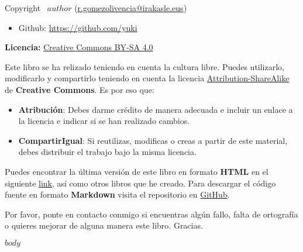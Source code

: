 \documentclass[11pt,titlepage,twoside,openany]{book}
\makeatletter
\renewcommand\tableofcontents{
  \begingroup
    \hypersetup{hidelinks} %
    \pagestyle{toc}
    \setcounter{tocdepth}{2}    %
    \setcounter{secnumdepth}{4} %
    \setlength{\parskip}{0em}
    \@starttoc{toc}
    \setlength{\parskip}{1.2em}
  \endgroup
  \thispagestyle{toc} %
  \clearpage
}
\newenvironment{custombox}[4]{
  \begin{tcolorbox}[
      colframe=#1, colbacktitle=#1,
      colupper=#1, colback=#2,
      enhanced, sidebyside, segmentation hidden,
      lefthand width=1.2cm,
      title=\textbf{#3},]
    \centering
    \color{#1}
    \fontsize{30pt}{-10pt}#4
    \tcblower
    \color{#1}
}{
  \end{tcolorbox}
}
\newenvironment{infobox}{
  \begin{custombox}{cyan!60!black}{cyan!5!white}{Información}{\faInfoCircle}
}{
  \end{custombox}
}
\makeatother
\begin{document}
\restoregeometry
\clearpage %

\thispagestyle{empty}

\null
\vfill
\begin{flushleft}
    

    Copyright \textcopyright \ $author$ \hspace{1pt} (\href{mailto:r.gomezolivencia@irakasle.eus}{r.gomezolivencia@irakasle.eus})
    \begin{itemize}
        \item Github: \href{https://github.com/yuki}{https://github.com/yuki}
    \end{itemize}


    \vspace{5mm}
    \textbf{Licencia: } \href{https://creativecommons.org/licenses/by-sa/4.0/deed.es}{Creative Commons BY-SA 4.0}


    Este libro se ha relizado teniendo en cuenta la cultura libre. Puedes utilizarlo, modificarlo y compartirlo teniendo en cuenta la licencia \href{https://creativecommons.org/licenses/by-sa/4.0/}{Attribution-ShareAlike} de \textbf{Creative Commons}. Es por eso que:

    \begin{itemize}
        \item \textbf{Atribución}: Debes darme crédito de manera adecuada e incluir un enlace a la licencia e indicar si se han realizado cambios.
        \item \textbf{CompartirIgual}: Si reutilizas, modificas o creas a partir de este material, debes distribuir el trabajo bajo la misma licencia.
    \end{itemize}


    Puedes encontrar la última versión de este libro en formato \textbf{HTML} en el siguiente \href{https://yuki.github.io/my-books/}{link}, así como otros libros que he creado. Para descargar el código fuente en formato \textbf{Markdown} visita el repositorio en \href{https://github.com/yuki/my-books}{GitHub}.

    \begin{infobox}
        Por favor, ponte en contacto conmigo si encuentras algún fallo, falta de ortografía o quieres mejorar de alguna manera este libro. Gracias.
    \end{infobox}
    \vspace{5mm}
\end{flushleft}

\clearpage %


\makeatletter
  \renewcommand\@dotsep{200}
\makeatother

\tableofcontents


$body$
\end{document}
